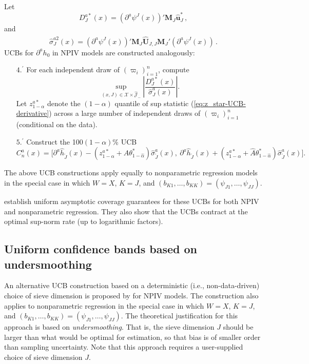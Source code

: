 \documentclass[
]{jss}
\begin{document}
Let \[
 D_J^{a*}(x) = (\partial^a \psi^J(x))' \mathbf M_J^{\phantom \prime} \hat{\mathbf u}_J^*\,, 
\] and \[
 \hat \sigma_{J}^{a2}(x) =(\partial^a \psi^J(x))' \mathbf M_J^{\phantom \prime} \widehat{\mathbf U}_{J,J}^{\phantom \prime} \mathbf M_J' (\partial^a  \psi^J(x))\,.
\] UCBs for \(\partial^a h_0\) in NPIV models are constructed
analogously:

\begin{enumerate}
\item[$4.^{\prime}$] For each independent draw of $(\varpi_i)_{i=1}^n$, compute
\begin{equation} \label{eq:z_star-UCB-derivative}
 \sup_{(x,J) \in \mathcal{X} \times \hat{\mathcal J}_{-}} \left| \frac{D_J^{a*}(x)}{\hat \sigma_J^a(x)} \right|.
\end{equation}
Let $z_{1-\alpha}^{a*}$ denote the $(1-\alpha )$ quantile of sup statistic (\ref{eq:z_star-UCB-derivative}) across a large number of independent draws of $(\varpi_i)_{i=1}^n$ (conditional on the data).
\item[$5.^{\prime}$] Construct the 100$(1-\alpha)$\% UCB
\begin{equation} \label{band-derivative}
 C_n^a(x) = \bigg[ \partial^a \hat{h}_{\tilde{J}}(x) - \left(\! z_{1-\alpha}^{a*} + \hat A \theta^*_{1-\hat \alpha} \! \right) \hat \sigma_{\tilde J}^a(x) ,~ \partial^a \hat{h}_{\tilde{J}}(x) + \left( \!z_{1-\alpha}^{a*} + \hat A \theta^*_{1-\hat \alpha} \! \right ) \hat \sigma_{\tilde J}^a(x) \bigg] .
\end{equation}
\end{enumerate}

The above UCB constructions apply equally to nonparametric regression
models in the special case in which \(W = X\), \(K = J\), and
\((b_{K1},\ldots,b_{KK}) = (\psi_{J1},\ldots,\psi_{JJ})\).

\citet{CCK} establish uniform asymptotic coverage guarantees for these
UCBs for both NPIV and nonparametric regression. They also show that the
UCBs contract at the optimal sup-norm rate (up to logarithmic factors).

\subsection{Uniform confidence bands based on
undersmoothing}\label{uniform-confidence-bands-based-on-undersmoothing}

An alternative UCB construction based on a deterministic (i.e.,
non-data-driven) choice of sieve dimension is proposed by \citet{CCQE}
for NPIV models. The construction also applies to nonparametric
regression in the special case in which \(W = X\), \(K = J\), and
\((b_{K1},\ldots,b_{KK}) = (\psi_{J1},\ldots,\psi_{JJ})\). The
theoretical justification for this approach is based on
\emph{undersmoothing}. That is, the sieve dimension \(J\) should be
larger than what would be optimal for estimation, so that bias is of
smaller order than sampling uncertainty. Note that this approach
requires a user-supplied choice of sieve dimension \(J\).
\end{document}
